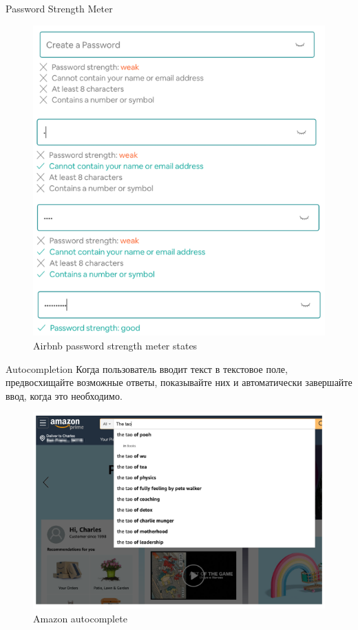 \documentclass{beamer}
\begin{document}
\begin{frame}[t]{Password Strength Meter}
	\begin{figure}[h]
		\centering
		\includegraphics[scale=0.4]{images/lec08-pic49.png}
		\caption{Airbnb password strength meter states}
	\end{figure}
\end{frame}

\begin{frame}[t]{Autocompletion}
	Когда пользователь вводит текст в текстовое поле, предвосхищайте возможные ответы, показывайте них и автоматически завершайте ввод, когда это необходимо.
	\begin{figure}[h]
		\centering
		\includegraphics[scale=0.4]{images/lec08-pic50.png}
		\caption{Amazon autocomplete}
	\end{figure}
\end{frame}
\end{document}
